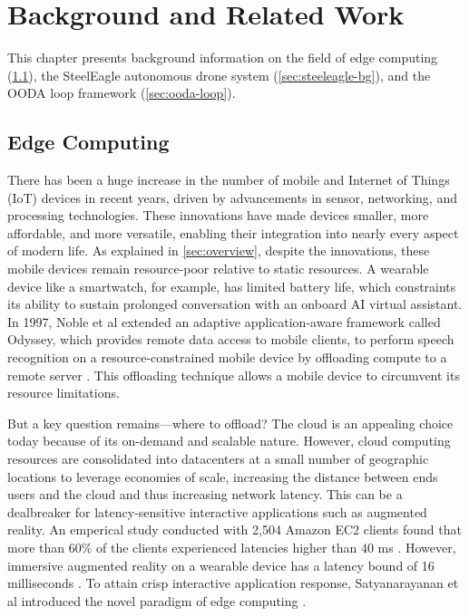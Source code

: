 \chapter{Background and Related Work}
\label{ch:background}

This chapter presents background information on the field of edge computing
(\cref{sec:bg-edge}), the SteelEagle autonomous drone system
(\cref{sec:steeleagle-bg}), and the OODA loop framework (\cref{sec:ooda-loop}).

\section{Edge Computing}
\label{sec:bg-edge}

There has been a huge increase in the number of mobile and Internet of Things
(IoT) devices in recent years, driven by advancements in sensor, networking,
and processing technologies.  These innovations have made devices smaller, more
affordable, and more versatile, enabling their integration into nearly every
aspect of modern life. As explained in \cref{sec:overview}, despite the
innovations, these mobile devices remain resource-poor relative to static
resources. A wearable device like a smartwatch, for example, has limited
battery life, which constraints its ability to sustain prolonged conversation
with an onboard AI virtual assistant. In 1997, Noble et al extended an adaptive
application-aware framework called Odyssey, which provides remote data access
to mobile clients, to perform speech recognition on a resource-constrained
mobile device by offloading compute to a remote server \cite{noble1997}. This
offloading technique allows a mobile device to circumvent its resource
limitations.

But a key question remains---where to offload? The cloud is an
appealing choice today because of its on-demand and scalable nature. However,
cloud computing resources are consolidated into datacenters at a small number
of geographic locations to leverage economies of scale, increasing the distance
between ends users and the cloud and thus increasing network latency. This can
be a dealbreaker for latency-sensitive interactive applications such as
augmented reality. An emperical study conducted with 2,504 Amazon EC2 clients
found that more than 60\% of the clients experienced latencies higher than 40
ms \cite{choy2012}. However, immersive augmented reality on a wearable device
has a latency bound of 16 milliseconds \cite{ellis2004}.
To attain crisp interactive application response,
Satyanarayanan et al introduced the novel paradigm of edge computing
\cite{satya2009}.



